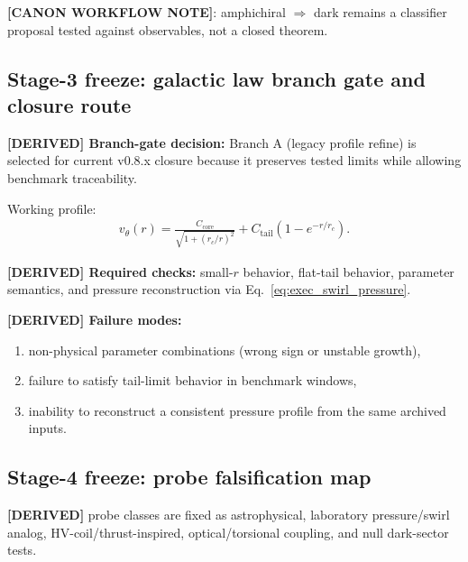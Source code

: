 \textbf{[CANON WORKFLOW NOTE]}:
amphichiral $\Rightarrow$ dark remains a classifier proposal tested against observables, not a closed theorem.

\subsection{Stage-3 freeze: galactic law branch gate and closure route}
\textbf{[DERIVED] Branch-gate decision:} Branch A (legacy profile refine) is selected for current v0.8.x closure because it preserves tested limits while allowing benchmark traceability.

Working profile:
\begin{align}
    v_\theta(r)
    =
    \frac{C_{\mathrm{core}}}{\sqrt{1+(r_c/r)^2}}
    +
    C_{\mathrm{tail}}\left(1-e^{-r/r_c}\right).
\end{align}

\textbf{[DERIVED] Required checks:}
small-$r$ behavior, flat-tail behavior, parameter semantics, and pressure reconstruction via Eq.~\eqref{eq:exec_swirl_pressure}.

\textbf{[DERIVED] Failure modes:}
\begin{enumerate}
    \item non-physical parameter combinations (wrong sign or unstable growth),
    \item failure to satisfy tail-limit behavior in benchmark windows,
    \item inability to reconstruct a consistent pressure profile from the same archived inputs.
\end{enumerate}

\subsection{Stage-4 freeze: probe falsification map}
\textbf{[DERIVED]} probe classes are fixed as astrophysical, laboratory pressure/swirl analog, HV-coil/thrust-inspired, optical/torsional coupling, and null dark-sector tests.


